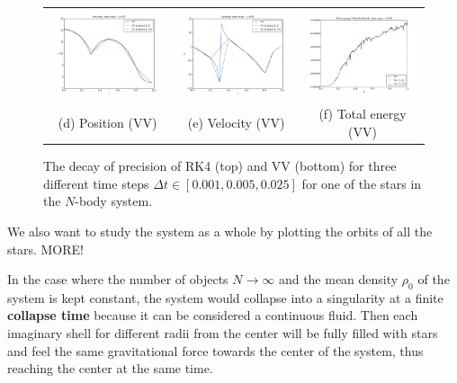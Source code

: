 \documentclass{article}
\begin{document}
\begin{multicols}{2}
\begin{figure}
\begin{center}
\begin{tabular}{ccc}
	\includegraphics[width=60mm]{Images/comparison_N_VV_position.png}
	& \includegraphics[width=60mm]{Images/comparison_N_VV_velocity.png}
	& \includegraphics[width=60mm]{Images/comparison_E_VV_0001.png} \\
	(d) Position (VV) 					&(e) Velocity (VV)				& (f) Total energy (VV)  \\[6pt]
\end{tabular}
\caption{The decay of precision of RK4 (top) and VV (bottom) for three different time steps $\Delta t \in [0.001, 0.005, 0.025]$ for one of the stars in the $N$-body system.}\label{fig:N_body_timestep}
\end{center}
\end{figure}
We also want to study the system as a whole by plotting the orbits of all the stars. MORE!

In the case where the number of objects $N \rightarrow \infty$ and the mean density $\rho_0$ of the system is kept constant, the system would collapse into a singularity at a finite \textbf{collapse time} because it can be considered a continuous fluid. Then each imaginary shell for different radii from the center will be fully filled with stars and feel the same gravitational force towards the center of the system, thus reaching the center at the same time. 


\end{multicols}
\end{document}
